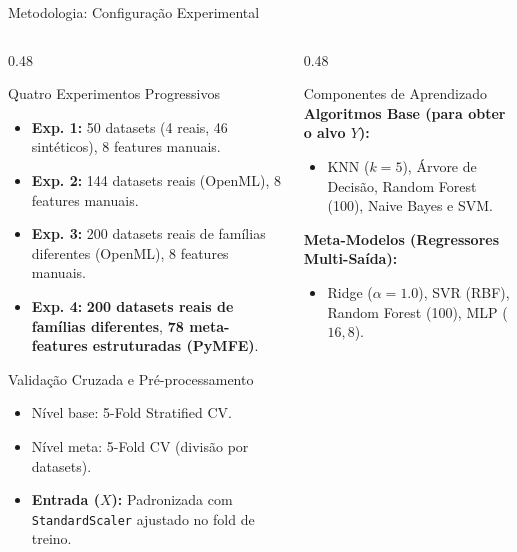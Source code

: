 \documentclass[aspectratio=169, 10pt]{beamer}
\begin{document}
\begin{frame}{Metodologia: Configuração Experimental}
  \begin{columns}[T]
    \begin{column}{0.48\textwidth}
      \begin{block}{Quatro Experimentos Progressivos}
        \footnotesize
        \begin{itemize}
          \item \textbf{Exp. 1:} 50 datasets (4 reais, 46 sintéticos), 8 features manuais.
          \item \textbf{Exp. 2:} 144 datasets reais (OpenML), 8 features manuais.
          \item \textbf{Exp. 3:} 200 datasets reais de famílias diferentes (OpenML), 8 features manuais.
          \item \textbf{Exp. 4:} \textbf{200 datasets reais de famílias diferentes}, \textbf{78 meta-features estruturadas (PyMFE)}.
        \end{itemize}
      \end{block}
      \begin{block}{Validação Cruzada e Pré-processamento}
        \footnotesize
        \begin{itemize}
          \item Nível base: 5-Fold Stratified CV.
          \item Nível meta: 5-Fold CV (divisão por datasets).
          \item \textbf{Entrada ($X$):} Padronizada com \texttt{StandardScaler} ajustado no fold de treino.
        \end{itemize}
      \end{block}
    \end{column}
    
    \begin{column}{0.48\textwidth}
      \begin{block}{Componentes de Aprendizado}
        \footnotesize
        \textbf{Algoritmos Base (para obter o alvo $Y$):}
        \begin{itemize}
          \item KNN ($k=5$), Árvore de Decisão, Random Forest (100), Naive Bayes e SVM.
        \end{itemize}
        \vspace{0.2cm}
        \textbf{Meta-Modelos (Regressores Multi-Saída):}
        \begin{itemize}
          \item Ridge ($\alpha = 1.0$), SVR (RBF), Random Forest (100), MLP ($16, 8$).
        \end{itemize}
      \end{block}
    \end{column}
  \end{columns}
\end{frame}
\end{document}
